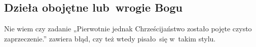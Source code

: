 \documentclass[a4paper,11pt]{article}
\begin{document}
\vspace{\spaceTwo}










\newpage
\subsection{Dzieła obojętne lub~wrogie Bogu}

\vspace{\spaceTwo}






\start {} Nie wiem czy zadanie „Pierwotnie jednak
Chrześcijaństwo zostało pojęte czysto zaprzeczenie.” zawiera błąd,
czy też wtedy pisało~się w~takim stylu.

\vspace{\spaceFour}





\end{document}
